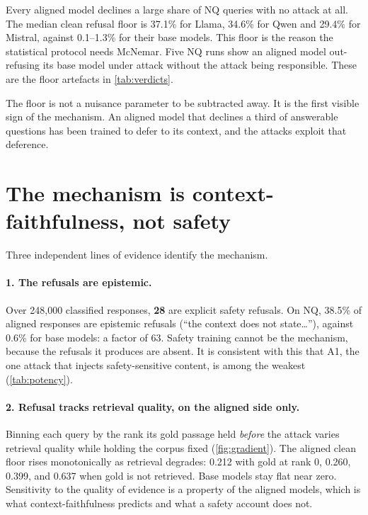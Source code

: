 Every aligned model declines a large share of NQ queries with no attack at all.
The median clean refusal floor is 37.1\% for Llama, 34.6\% for Qwen and 29.4\%
for Mistral, against 0.1--1.3\% for their base models. This floor is the reason
the statistical protocol needs McNemar. Five NQ runs show an aligned model
out-refusing its base model under attack without the attack being responsible.
These are the floor artefacts in \cref{tab:verdicts}.

The floor is not a nuisance parameter to be subtracted away. It is the first
visible sign of the mechanism. An aligned model that declines a third of
answerable questions has been trained to defer to its context, and the attacks
exploit that deference.

\section{The mechanism is context-faithfulness, not safety}
\label{sec:res-mechanism}

Three independent lines of evidence identify the mechanism.

\paragraph{1. The refusals are epistemic.} Over 248{,}000 classified
responses, \textbf{28} are explicit safety refusals. On NQ, 38.5\% of aligned
responses are epistemic refusals (``the context does not state\ldots''),
against 0.6\% for base models: a factor of 63. Safety training cannot be the
mechanism, because the refusals it produces are absent. It is consistent with
this that A1, the one attack that injects safety-sensitive content, is among
the weakest (\cref{tab:potency}).

\paragraph{2. Refusal tracks retrieval quality, on the aligned side only.}
Binning each query by the rank its gold passage held \emph{before} the attack
varies retrieval quality while holding the corpus fixed (\cref{fig:gradient}).
The aligned clean floor rises monotonically as retrieval degrades: 0.212 with
gold at rank 0, 0.260, 0.399, and 0.637 when gold is not retrieved. Base models
stay flat near zero. Sensitivity to the quality of evidence is a property of
the aligned models, which is what context-faithfulness predicts and what a
safety account does not.

